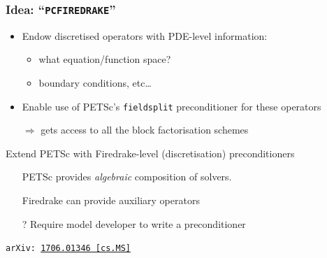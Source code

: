 \documentclass[presentation,aspectratio=43, 10pt]{beamer}
\newcommand{\cmark}{\ding{51}}
\newcommand{\xmark}{\ding{55}}
\newcommand{\arxivlink}[2]{{\texttt{arXiv:\,\href{https://arxiv.org/abs/#1}{#1\,[#2]}}}}
\begin{document}
\begin{frame}
  \frametitle{Idea: ``\texttt{PCFIREDRAKE}''}
  \begin{itemize}
  \item Endow discretised operators with PDE-level information:
    \begin{itemize}
    \item what equation/function space?
    \item boundary conditions, etc\ldots
    \end{itemize}
  \item Enable use of PETSc's \texttt{fieldsplit} preconditioner for
    these operators
  \item[$\Rightarrow$] gets access to all the block factorisation
    schemes
  \end{itemize}

  \begin{block}{Extend PETSc with Firedrake-level (discretisation) preconditioners}
    \begin{itemize}
    \item[\cmark] PETSc provides \emph{algebraic} composition of solvers. \nocite{Brown:2012}

    \item[\cmark] Firedrake can provide auxiliary operators

    \item[\xmark?] Require model developer to write a preconditioner
    \end{itemize}
  \end{block}
  \begin{flushright}
    \textcite{Kirby:2018} \arxivlink{1706.01346}{cs.MS} \hspace{4em}
  \end{flushright}
\end{frame}
\end{document}
